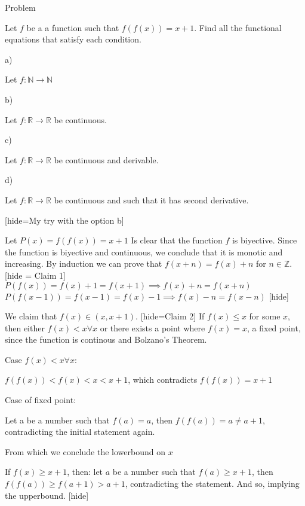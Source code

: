 \begin{problem}
	\begin{tcolorbox}
\begin{bolded}Problem\end{bolded}
Let $f$ be a a function such that $f(f(x))=x+1$. Find all the functional equations that satisfy each condition.

\begin{bolded}a)\end{bolded} Let $f : \mathbb{N} \to \mathbb{N} $
\begin{bolded}b)\end{bolded} Let $f : \mathbb{R} \to \mathbb{R}$ be continuous.
\begin{bolded}c)\end{bolded} Let $f : \mathbb{R} \to \mathbb{R}$ be continuous and derivable.
\begin{bolded}d)\end{bolded} Let $f : \mathbb{R} \to \mathbb{R}$ be continuous and such that it has second derivative.

\end{tcolorbox}

[hide=My try with the option b]

Let $P(x) = f(f(x))=x+1$
Is clear that the function $f$ is biyective. Since the function is biyective and continuous, we conclude that it is monotic and increasing. By induction we can prove that $f(x+n) = f(x)+n$ for $n\in \mathbb{Z}$. [hide = Claim 1]
$P(f(x)) = f(x)+1 = f(x+1) \implies  f(x)+n = f(x+n) $
$P(f(x-1)) = f(x-1) = f(x)-1 \implies f(x)-n = f(x-n)$
[\/hide]

 We claim that $f(x) \in (x,x+1)$. [hide=Claim 2]
If $f(x)\leq x$ for some $x$,  then either $f(x)<x \forall x$ or there exists a point where $f(x)=x$, a fixed point, since the function is continous and Bolzano's Theorem.

\begin{bolded}Case $f(x) < x \forall x$: \end{bolded} $f(f(x)) < f(x) < x < x+1$, which contradicts $f(f(x))=x+1$
\begin{bolded}Case of fixed point:\end{bolded} Let a be a number such that  $f(a)=a$, then $f(f(a))=a \not = a+1$, contradicting the initial statement again.

From which we conclude the lowerbound on $x$

If $f(x)\geq x+1$, then: let $a$ be a number such that $f(a)\geq x+1$, then $f(f(a)) \geq f(a+1) > a+1$, contradicting the statement. And so, implying the upperbound.
[\/hide]


\end{problem}
